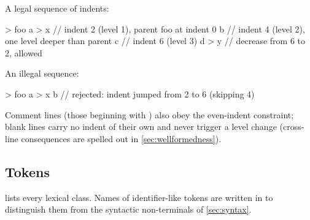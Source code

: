 A legal sequence of indents:
\begin{ffcode}
[] > foo
  a > x          // indent 2 (level 1), parent foo at indent 0
    b            // indent 4 (level 2), one level deeper than parent
      c          // indent 6 (level 3)
  d > y          // decrease from 6 to 2, allowed
\end{ffcode}

An illegal sequence:
\begin{ffcode}
[] > foo
  a > x
      b          // rejected: indent jumped from 2 to 6 (skipping 4)
\end{ffcode}

Comment lines (those beginning with \ff{\#}) also obey the even-indent constraint;
  blank lines carry no indent of their own and never trigger a level change
  (cross-line consequences are spelled out in \cref{sec:wellformedness}).

\subsection{Tokens}\label{sec:lexical:tokens}

 lists every lexical class.
Names of identifier-like tokens are written in 
  to distinguish them from the syntactic non-terminals of \cref{sec:syntax}.

